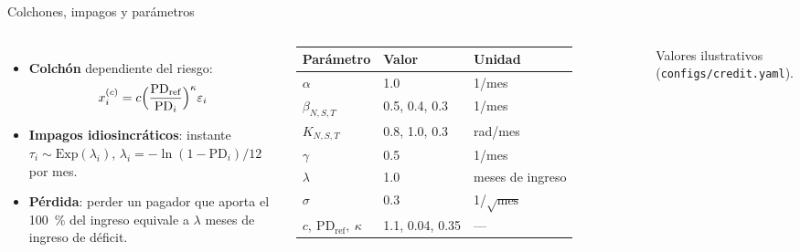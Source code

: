 \documentclass[aspectratio=169,10pt]{beamer}
\begin{document}
\begin{frame}{Colchones, impagos y parámetros}
\begin{columns}[T]
\begin{itemize}
\item \textbf{Colchón} dependiente del riesgo:
\[
x_i^{(c)} = c\Bigl(\frac{\mathrm{PD}_\text{ref}}{\mathrm{PD}_i}\Bigr)^{\kappa}\varepsilon_i
\]
\item \textbf{Impagos idiosincráticos}: instante $\tau_i\sim\mathrm{Exp}(\lambda_i)$,
$\lambda_i=-\ln(1-\mathrm{PD}_i)/12$ por mes.
\item \textbf{Pérdida}: perder un pagador que aporta el 100~\% del ingreso equivale a
$\lambda$ meses de ingreso de déficit.
\end{itemize}
\footnotesize
\begin{tabular}{lll}
\toprule
Parámetro & Valor & Unidad \\
\midrule
$\alpha$ & 1.0 & 1/mes \\
$\beta_{N,S,T}$ & 0.5, 0.4, 0.3 & 1/mes \\
$K_{N,S,T}$ & 0.8, 1.0, 0.3 & rad/mes \\
$\gamma$ & 0.5 & 1/mes \\
$\lambda$ & 1.0 & meses de ingreso \\
$\sigma$ & 0.3 & 1/$\sqrt{\text{mes}}$ \\
$c,\ \mathrm{PD}_\text{ref},\ \kappa$ & 1.1, 0.04, 0.35 & — \\
\bottomrule
\end{tabular}
\vspace{0.1cm}

\scriptsize Valores ilustrativos (\texttt{configs/credit.yaml}).
\end{columns}
\end{frame}
\end{document}
